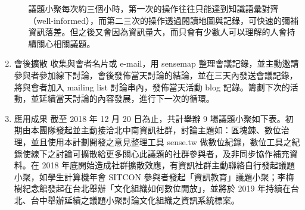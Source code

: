 \documentclass[12pt,a4paper]{article}
\begin{document}
\begin{enumerate}
\begin{enumerate}
議題小聚每次約三個小時，第一次的操作往往只能達到知識語彙對齊（well-informed），而第二三次的操作透過閱讀地圖與記錄，可快速的彌補資訊落差。但之後又會因為資訊量大，而只會有少數人可以理解的人會持續關心相關議題。
\end{enumerate}
\item 會後擴散
\label{sec:org7d0a4e1}
收集與會者名片或 e-mail，用 sensemap 整理會議記錄，並主動邀請參與者參加線下討論，會後發佈當天討論的結論，並在三天內發送會議記錄，將與會者加入 mailing list 討論串內，發佈當天活動 blog 記錄。籌劃下次的活動，並延續當天討論的內容發展，進行下一次的循環。
\item 應用成果
\label{sec:org2618b7e}
截至 2018 年 12 月 20 日為止，共計舉辦 9 場議題小聚如下表。初期由本團隊發起並主動接洽北中南資訊社群，討論主題如：區塊鍊、數位治理，並且使用本計劃開發之意見整理工具 sense.tw 做數位紀錄，數位工具之紀錄使線下之討論可擴散給更多關心此議題的社群參與者，及非同步協作補充資料。在 2018 年底開始造成社群擴散效應，有資訊社群主動聯絡自行發起議題小聚，如學生計算機年會 SITCON 參與者發起「資訊教育」議題小聚；李梅樹紀念館發起在台北舉辦「文化組織如何數位開放」，並將於 2019 年持續在台北、台中舉辦延續之議題小聚討論文化組織之資訊系統標案。


\end{enumerate}
\end{document}
